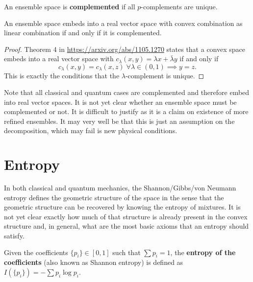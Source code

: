 \begin{defn}
	An ensemble space is \textbf{complemented} if all $p$-complements are unique.
\end{defn}

\begin{prop}
	An ensemble space embeds into a real vector space with convex combination as linear combination if and only if it is complemented.
\end{prop}
\begin{proof}
	Theorem 4 in \url{https://arxiv.org/abs/1105.1270} states that a convex space embeds into a real vector space with $c_\lambda(x,y) = \lambda x + \bar{\lambda}y$ if and only if
	$$ c_\lambda(x,y) = c_\lambda(x,z) \; \forall \lambda \in (0,1) \implies y = z.$$ This is exactly the conditions that the $\lambda$-complement is unique.	
\end{proof}

\begin{remark}
	Note that all classical and quantum cases are complemented and therefore embed into real vector spaces. It is not yet clear whether an ensemble space must be complemented or not. It is difficult to justify as it is a claim on existence of more refined ensembles. It may very well be that this is just an assumption on the decomposition, which may fail is new physical conditions.
\end{remark}


\section{Entropy}

In both classical and quantum mechanics, the Shannon/Gibbs/von Neumann entropy defines the geometric structure of the space in the sense that the geometric structure can be recovered by knowing the entropy of mixtures. It is not yet clear exactly how much of that structure is already present in the convex structure and, in general, what are the most basic axioms that an entropy should satisfy.

\begin{defn}
	Given the coefficients $\{p_i\} \in [0,1]$ such that $\sum p_i = 1$, the \textbf{entropy of the coefficients} (also known as Shannon entropy) is defined as $I(\{p_i\}) = - \sum p_i \log p_i $.
\end{defn}

